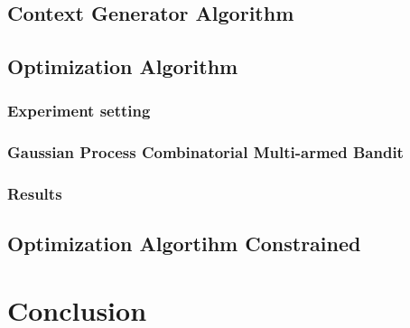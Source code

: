 \documentclass[12pt]{article}
\begin{document}
	\subsection{Context Generator Algorithm}
	
	\newpage
	\subsection{Optimization Algorithm}
	
	\subsubsection{Experiment setting}
	
	\subsubsection{Gaussian Process Combinatorial Multi-armed Bandit}
	
	\subsubsection{Results}
	
	\newpage
	\subsection{Optimization Algortihm Constrained}
	
	
	\section{Conclusion}
\end{document}
